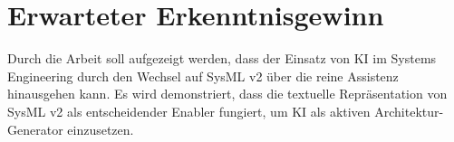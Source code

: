 \documentclass[12pt, a4paper]{article}
\begin{document}
\section{Erwarteter Erkenntnisgewinn}

Durch die Arbeit soll aufgezeigt werden, dass der Einsatz von KI im Systems Engineering durch den Wechsel auf SysML v2 über die reine Assistenz hinausgehen kann. Es wird demonstriert, dass die textuelle Repräsentation von SysML v2 als entscheidender Enabler fungiert, um KI als aktiven Architektur-Generator einzusetzen.
\end{document}
